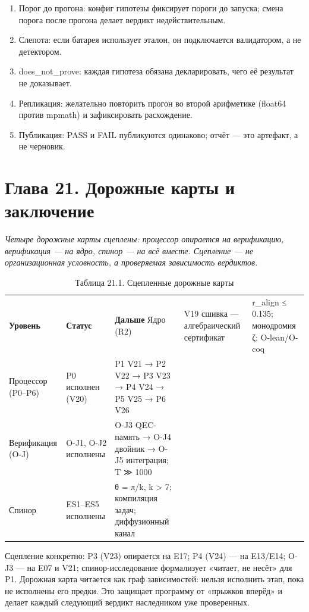 \documentclass[11pt,a4paper]{article}
\begin{document}
\begin{enumerate}
  \item Порог до прогона: конфиг гипотезы фиксирует пороги до запуска; смена порога после прогона делает вердикт недействительным.
  \item Слепота: если батарея использует эталон, он подключается валидатором, а не детектором.
  \item does\_not\_prove: каждая гипотеза обязана декларировать, чего её результат не доказывает.
  \item Репликация: желательно повторить прогон во второй арифметике (float64 против mpmath) и зафиксировать расхождение.
  \item Публикация: PASS и FAIL публикуются одинаково; отчёт — это артефакт, а не черновик.
\end{enumerate}

\section{Глава 21. Дорожные карты и заключение}

\noindent\textit{\color{copper}Четыре дорожные карты сцеплены: процессор опирается на верификацию, верификация — на ядро, спинор — на всё вместе. Сцепление — не организационная условность, а проверяемая зависимость вердиктов.}

\begin{table}[htbp]\centering\small
\caption{Таблица 21.1. Сцепленные дорожные карты}
\begin{tabular}{p{} p{} p{}}
\toprule
\textbf{Уровень} & \textbf{Статус} & \textbf{Дальше}
\midrule
Ядро (R2) & V19 сшивка — алгебраический сертификат & r\_align ≤ 0.135; монодромия ζ; O-lean/O-coq \\
Процессор (P0–P6) & P0 исполнен (V20) & P1 V21 → P2 V22 → P3 V23 → P4 V24 → P5 V25 → P6 V26 \\
Верификация (O-J) & O-J1, O-J2 исполнены & O-J3 QEC-память → O-J4 двойник → O-J5 интеграция; T ≫ 1000 \\
Спинор & ES1–ES5 исполнены & θ = π/k, k > 7; компиляция задач; диффузионный канал \\
\bottomrule
\end{tabular}
\end{table}

Сцепление конкретно: P3 (V23) опирается на E17; P4 (V24) — на E13/E14; O-J3 — на E07 и V21; спинор-исследование формализует «читает, не несёт» для P1. Дорожная карта читается как граф зависимостей: нельзя исполнить этап, пока не исполнены его предки. Это защищает программу от «прыжков вперёд» и делает каждый следующий вердикт наследником уже проверенных.
\end{document}
